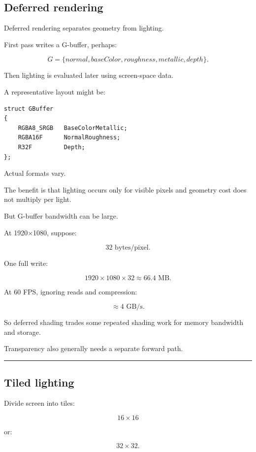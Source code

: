 \subsection{Deferred rendering}\label{04-visual-computing-ii-ch040-deferred-rendering}

Deferred rendering separates geometry from lighting.

First pass writes a G-buffer, perhaps:

\[
G=
\{
normal,
baseColor,
roughness,
metallic,
depth
\}.
\]

Then lighting is evaluated later using screen-space data.

A representative layout might be:

\begin{verbatim}
struct GBuffer
{
    RGBA8_SRGB   BaseColorMetallic;
    RGBA16F      NormalRoughness;
    R32F         Depth;
};
\end{verbatim}

Actual formats vary.

The benefit is that lighting occurs only for visible pixels and geometry cost does not multiply per light.

But G-buffer bandwidth can be large.

At 1920×1080, suppose:

\[
32\text{ bytes/pixel}.
\]

One full write:

\[
1920\times1080\times32
\approx66.4\text{ MB}.
\]

At 60 FPS, ignoring reads and compression:

\[
\approx4\text{ GB/s}.
\]

So deferred shading trades some repeated shading work for memory bandwidth and storage.

Transparency also generally needs a separate forward path.

\begin{center}\rule{0.5\linewidth}{0.5pt}\end{center}

\subsection{Tiled lighting}\label{04-visual-computing-ii-ch040-tiled-lighting}

Divide screen into tiles:

\[
16\times16
\]

or:

\[
32\times32.
\]

